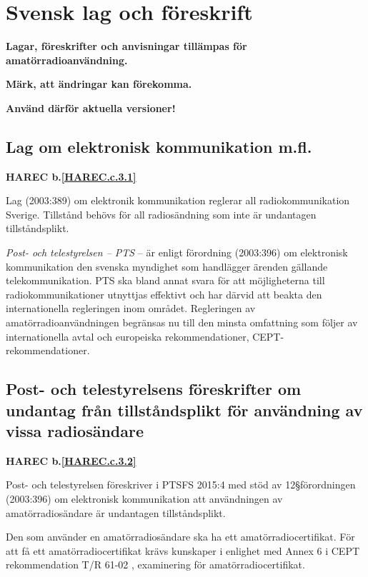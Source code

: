 \section{Svensk lag och föreskrift}

\textbf{Lagar, föreskrifter och anvisningar tillämpas för
  amatörradioanvändning.}

\textbf{Märk, att ändringar kan förekomma.}

\textbf{Använd därför aktuella versioner!}


\subsection{Lag om elektronisk kommunikation m.fl.}
\textbf{
HAREC b.\ref{HAREC.c.3.1}\label{myHAREC.c.3.1}
}

Lag (2003:389) om elektronik kommunikation reglerar all radiokommunikation
Sverige.
Tillstånd behövs för all radiosändning som inte är undantagen tillståndsplikt.

\emph{Post- och telestyrelsen -- PTS} -- är enligt förordning (2003:396) om
elektronisk kommunikation den svenska myndighet som handlägger
ärenden gällande telekommunikation.
PTS ska bland annat svara för att möjligheterna till radiokommunikationer
utnyttjas effektivt och har därvid att beakta den internationella regleringen
inom området.
Regleringen av amatörradioanvändningen begränsas nu till den minsta omfattning
som följer av internationella avtal och europeiska rekommendationer,
CEPT-rekommendationer.

\subsection{Post- och telestyrelsens föreskrifter om undantag från tillståndsplikt för användning av vissa radiosändare}
\textbf{
HAREC b.\ref{HAREC.c.3.2}\label{myHAREC.c.3.2}
}

Post- och telestyrelsen föreskriver i PTSFS 2015:4 \cite{PTSFS2015:4} med stöd
av 12\S förordningen (2003:396) \cite{SFS2003:396} om elektronisk kommunikation
att användningen av amatörradiosändare är undantagen tillståndsplikt.

Den som använder en amatörradiosändare ska ha ett amatörradiocertifikat.
För att få ett amatörradiocertifikat krävs kunskaper i enlighet med Annex 6 i
CEPT rekommendation T/R 61-02 \cite{TR6102}, examinering för amatörradiocertifikat.

